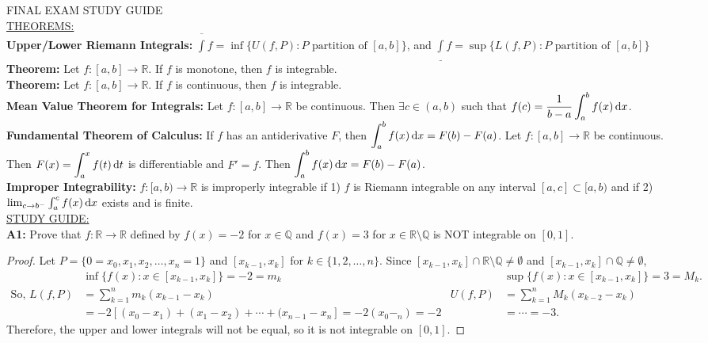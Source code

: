 \documentclass{article}
\begin{document}
    \noindent FINAL EXAM STUDY GUIDE\\
    
    \noindent \underline{THEOREMS:}\\
    \noindent \textbf{Upper/Lower Riemann Integrals: }$\displaystyle\overline{\int}f = \inf\{U(f,P) : P\text{ partition of $[a,b]$}\}$, and $\displaystyle\underline{\int} f = \sup\{L(f,P) : P\text{ partition of $[a,b]$}\}$\\
    
    \noindent \textbf{Theorem: }Let $f:[a,b] \to \mathbb{R}$. If $f$ is monotone, then $f$ is integrable.\\
    
    \noindent \textbf{Theorem: }Let $f:[a,b] \to \mathbb{R}$. If $f$ is continuous, then $f$ is integrable.\\
    
    \noindent \textbf{Mean Value Theorem for Integrals: }Let $f:[a,b] \to \mathbb{R}$ be continuous. Then $\exists c \in (a,b)$ such that $\displaystyle f(c) = \frac{1}{b-a}\int_a^b f(x) \dif x$.\\
    
    \noindent \textbf{Fundamental Theorem of Calculus: }If $f$ has an antiderivative $F$, then $\displaystyle\int_a^b f(x) \dif x = F(b)-F(a)$. Let $f:[a,b] \to \mathbb{R}$ be continuous. Then $\displaystyle F(x) = \int_a^x f(t) \dif t$ is differentiable and $F' = f$. Then $\displaystyle\int_a^b f(x) \dif x = F(b)-F(a)$.\\
    
    \noindent \textbf{Improper Integrability: } $f:[a,b) \to \mathbb{R}$ is improperly integrable if 1) $f$ is Riemann integrable on any interval $[a,c] \subset [a,b)$ and if 2) $\lim_{c\to b^-}\int_a^c f(x) \dif x$ exists and is finite.\\
    
    \noindent \underline{STUDY GUIDE:}\\
    \noindent \textbf{A1: }Prove that $f:\mathbb{R} \to \mathbb{R}$ defined by $f(x) = -2$ for $x \in \mathbb{Q}$ and $f(x) = 3$ for $x \in \mathbb{R}\setminus \mathbb{Q}$ is NOT integrable on $[0,1]$.
    \begin{proof}
        Let $P= \{0=x_0,x_1,x_2,\ldots,x_n=1\}$ and $[x_{k-1},x_k]$ for $k \in \{1,2,\ldots,n\}$. Since $[x_{k-1},x_k] \cap \mathbb{R \setminus \mathbb{Q}} \neq \emptyset$ and $[x_{k-1},x_k] \cap \mathbb{Q} \neq \emptyset$,
        \begin{align*}
            &\inf\{f(x):x \in [x_{k-1},x_k]\} = -2 = m_k    &   &\sup\{f(x): x \in [x_{k-1},x_k]\} = 3 = M_k.\\
            \text{So, }L(f,P) &= \sum_{k=1}^n m_k(x_{k-1}-x_k)   &   U(f,P) &= \sum_{k=1}^n M_k(x_{k-2}-x_k)\\
            &= -2[(x_0-x_1)+(x_1-x_2)+\cdots+(x_{n-1}-x_n] = -2(x_0-_n) = -2   &   &= \cdots = -3.   
        \end{align*}
        Therefore, the upper and lower integrals will not be equal, so it is not integrable on $[0,1]$.
    \end{proof}
    
\end{document}
